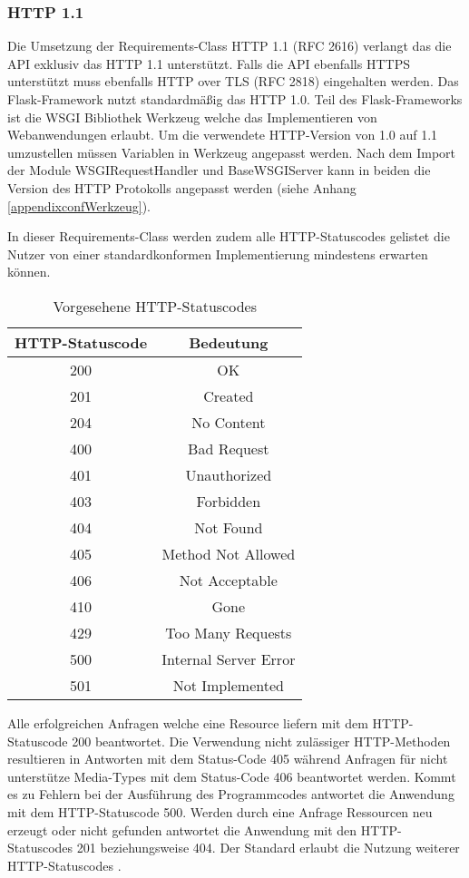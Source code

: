 \subsubsection{HTTP 1.1}
Die Umsetzung der Requirements-Class HTTP 1.1 (RFC 2616) verlangt das die API exklusiv das HTTP 1.1 unterstützt. 
Falls die API ebenfalls HTTPS unterstützt muss ebenfalls HTTP over TLS (RFC 2818) eingehalten werden. 
Das Flask-Framework nutzt standardmäßig das HTTP 1.0. Teil des Flask-Frameworks ist die WSGI Bibliothek Werkzeug welche
das Implementieren von Webanwendungen erlaubt. Um die verwendete HTTP-Version von 1.0 auf 1.1 umzustellen müssen Variablen 
in Werkzeug angepasst werden. Nach dem Import der Module WSGIRequestHandler und BaseWSGIServer kann in beiden die 
Version des HTTP Protokolls angepasst werden (siehe Anhang \ref{appendixconfWerkzeug}). 

In dieser Requirements-Class werden zudem alle HTTP-Statuscodes gelistet die Nutzer von einer standardkonformen Implementierung mindestens erwarten können. 
\begin{table}[H]
    \caption{Vorgesehene HTTP-Statuscodes \cite{ogc_api_processes_core}}
    \centering
    \begin{tabular}{c c} 
        HTTP-Statuscode & Bedeutung\\ 
        \hline
        200 & OK\\
        201 & Created\\
        204 & No Content\\
        400 & Bad Request\\
        401 & Unauthorized\\
        403 & Forbidden\\
        404 & Not Found\\
        405 & Method Not Allowed\\
        406 & Not Acceptable\\
        410 & Gone\\
        429 & Too Many Requests\\
        500 & Internal Server Error\\
        501 & Not Implemented\\
    \end{tabular}\label{httpcodes}
\end{table}
Alle erfolgreichen Anfragen welche eine Resource liefern mit dem HTTP-Statuscode 200 beantwortet. Die Verwendung nicht zulässiger HTTP-Methoden resultieren 
in Antworten mit dem Status-Code 405 während Anfragen für nicht unterstütze Media-Types mit dem Status-Code 406 beantwortet werden. Kommt es zu Fehlern bei der Ausführung 
des Programmcodes antwortet die Anwendung mit dem HTTP-Statuscode 500. Werden durch eine Anfrage Ressourcen neu erzeugt oder nicht gefunden antwortet die Anwendung mit 
den HTTP-Statuscodes 201 beziehungsweise 404. Der Standard erlaubt die Nutzung weiterer HTTP-Statuscodes \cite{ogc_api_processes_core}.

